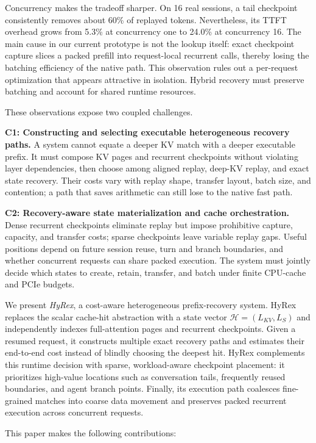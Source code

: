 \documentclass[sigconf,anonymous,review]{acmart}
\begin{document}
Concurrency makes the tradeoff sharper.  On 16 real sessions, a tail
checkpoint consistently removes about 60\% of replayed tokens.  Nevertheless,
its TTFT overhead grows from 5.3\% at concurrency one to 24.0\% at concurrency
16.  The main cause in our current prototype is not the lookup itself: exact
checkpoint capture slices a packed prefill into request-local recurrent calls,
thereby losing the batching efficiency of the native path.  This observation
rules out a per-request optimization that appears attractive in isolation.
Hybrid recovery must preserve batching and account for shared runtime
resources.

These observations expose two coupled challenges.

\textbf{C1: Constructing and selecting executable heterogeneous recovery
paths.}  A system cannot equate a deeper KV match with a deeper executable
prefix.  It must compose KV pages and recurrent checkpoints without violating
layer dependencies, then choose among aligned replay, deep-KV replay, and exact
state recovery.  Their costs vary with replay shape, transfer layout, batch
size, and contention; a path that saves arithmetic can still lose to the
native fast path.

\textbf{C2: Recovery-aware state materialization and cache orchestration.}
Dense recurrent checkpoints eliminate replay but impose prohibitive capture,
capacity, and transfer costs; sparse checkpoints leave variable replay gaps.
Useful positions depend on future session reuse, turn and branch boundaries,
and whether concurrent requests can share packed execution.  The system must
jointly decide which states to create, retain, transfer, and batch under finite
CPU-cache and PCIe budgets.

We present \emph{HyRex}, a cost-aware heterogeneous prefix-recovery system.
HyRex replaces the scalar cache-hit abstraction with a state vector
$\mathcal{H}=(L_{KV},L_S)$ and independently indexes full-attention pages and
recurrent checkpoints.  Given a resumed request, it constructs multiple exact
recovery paths and estimates their end-to-end cost instead of blindly choosing
the deepest hit.  HyRex complements this runtime decision with sparse,
workload-aware checkpoint placement: it prioritizes high-value locations such
as conversation tails, frequently reused boundaries, and agent branch points.
Finally, its execution path coalesces fine-grained matches into coarse data
movement and preserves packed recurrent execution across concurrent requests.

This paper makes the following contributions:
\end{document}

